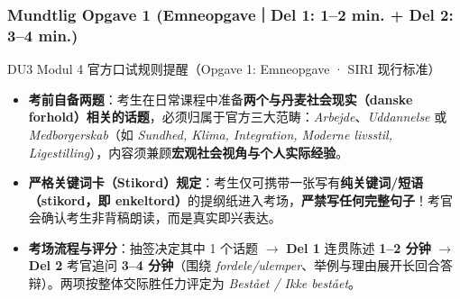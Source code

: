 
\subsubsection*{Mundtlig Opgave 1 (Emneopgave｜Del 1: 1--2 min. + Del 2: 3--4 min.)}

\begin{tipbox}{DU3 Modul 4 官方口试规则提醒（Opgave 1: Emneopgave · SIRI 现行标准）}
\small
\begin{itemize}
  \item \textbf{考前自备两题}：考生在日常课程中准备\textbf{两个与丹麦社会现实（danske forhold）相关的话题}，必须归属于官方三大范畴：\textit{Arbejde}、\textit{Uddannelse} 或 \textit{Medborgerskab}（如 \textit{Sundhed, Klima, Integration, Moderne livsstil, Ligestilling}），内容须兼顾\textbf{宏观社会视角与个人实际经验}。
  \item \textbf{严格关键词卡（Stikord）规定}：考生仅可携带一张写有\textbf{纯关键词/短语（stikord，即 enkeltord）}的提纲纸进入考场，\textbf{严禁写任何完整句子}！考官会确认考生非背稿朗读，而是真实即兴表达。
  \item \textbf{考场流程与评分}：抽签决定其中 1 个话题 $\rightarrow$ \textbf{Del 1} 连贯陈述 \textbf{1--2 分钟} $\rightarrow$ \textbf{Del 2} 考官追问 \textbf{3--4 分钟}（围绕 \textit{fordele/ulemper}、举例与理由展开长回合答辩）。两项按整体交际胜任力评定为 \textit{Bestået / Ikke bestået}。
\end{itemize}
\end{tipbox}

